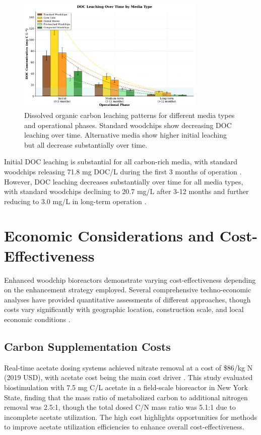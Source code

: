 \documentclass[12pt,a4paper]{article}
\begin{document}
\begin{figure}[ht]
\centering
\includegraphics[width=0.8\textwidth]{fig8_doc_leaching_scientific}
\caption{Dissolved organic carbon leaching patterns for different media types and operational phases. Standard woodchips show decreasing DOC leaching over time. Alternative media show higher initial leaching but all decrease substantially over time.}
\label{fig:doc_leaching}
\end{figure}

Initial DOC leaching is substantial for all carbon-rich media, with standard woodchips releasing 71.8 mg DOC/L during the first 3 months of operation \citep{RN625}. However, DOC leaching decreases substantially over time for all media types, with standard woodchips declining to 20.7 mg/L after 3-12 months and further reducing to 3.0 mg/L in long-term operation \citep{RN625}.

\section{Economic Considerations and Cost-Effectiveness}

Enhanced woodchip bioreactors demonstrate varying cost-effectiveness depending on the enhancement strategy employed. Several comprehensive techno-economic analyses have provided quantitative assessments of different approaches, though costs vary significantly with geographic location, construction scale, and local economic conditions \citep{RN312, RN312}.

\subsection{Carbon Supplementation Costs}

Real-time acetate dosing systems achieved nitrate removal at a cost of \$86/kg N (2019 USD), with acetate cost being the main cost driver \citep{RN242}. This study evaluated biostimulation with 7.5 mg C/L acetate in a field-scale bioreactor in New York State, finding that the mass ratio of metabolized carbon to additional nitrogen removal was 2.5:1, though the total dosed C/N mass ratio was 5.1:1 due to incomplete acetate utilization. The high cost highlights opportunities for methods to improve acetate utilization efficiencies to enhance overall cost-effectiveness.
\end{document}
